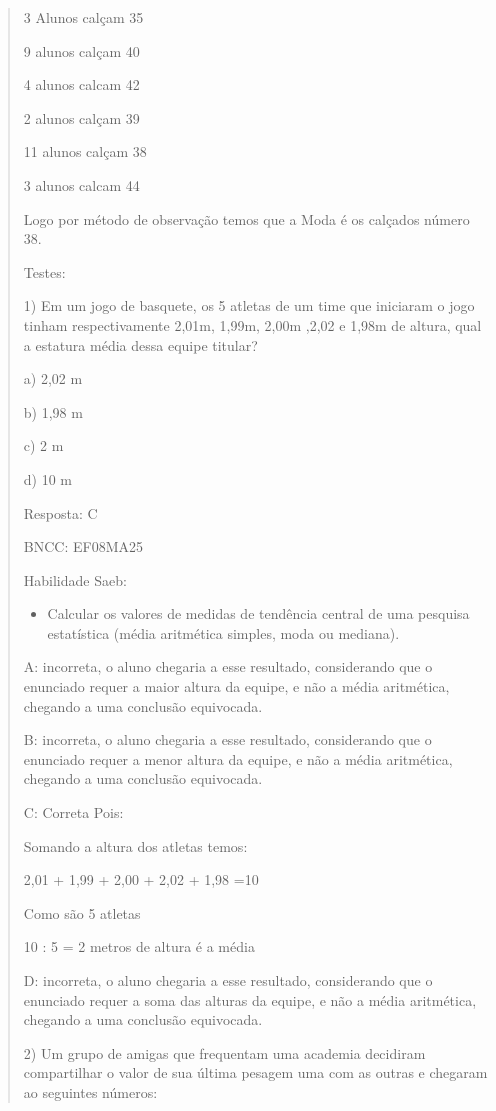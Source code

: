 \begin{quote}
\begin{escolha}
3 Alunos calçam 35

9 alunos calçam 40

4 alunos calcam 42

2 alunos calçam 39

11 alunos calçam 38

3 alunos calcam 44

Logo por método de observação temos que a Moda é os calçados número 38.

Testes:

1) Em um jogo de basquete, os 5 atletas de um time que iniciaram o jogo
tinham respectivamente 2,01m, 1,99m, 2,00m ,2,02 e 1,98m de altura, qual
a estatura média dessa equipe titular?

a) 2,02 m

b) 1,98 m

c) 2 m

d) 10 m

Resposta: C

BNCC: EF08MA25

Habilidade Saeb:

\begin{itemize}
\tightlist
\item
  Calcular os valores de medidas de tendência central de uma pesquisa
  estatística (média aritmética simples, moda ou mediana).
\end{itemize}

A: incorreta, o aluno chegaria a esse resultado, considerando que o
enunciado requer a maior altura da equipe, e não a média aritmética,
chegando a uma conclusão equivocada.

B: incorreta, o aluno chegaria a esse resultado, considerando que o
enunciado requer a menor altura da equipe, e não a média aritmética,
chegando a uma conclusão equivocada.

C: Correta Pois:

Somando a altura dos atletas temos:

2,01 + 1,99 + 2,00 + 2,02 + 1,98 =10

Como são 5 atletas

10 : 5 = 2 metros de altura é a média

D: incorreta, o aluno chegaria a esse resultado, considerando que o
enunciado requer a soma das alturas da equipe, e não a média aritmética,
chegando a uma conclusão equivocada.

2) Um grupo de amigas que frequentam uma academia decidiram compartilhar
o valor de sua última pesagem uma com as outras e chegaram ao seguintes
números:


\end{escolha}
\end{quote}

